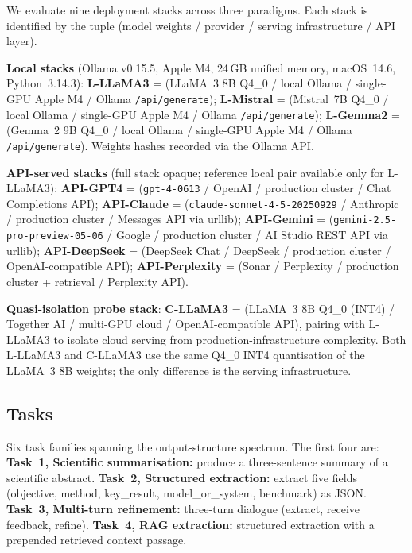 \documentclass[sn-nature]{sn-jnl}
\begin{document}
We evaluate nine deployment stacks across three paradigms.
Each stack is identified by the tuple (model weights / provider / serving infrastructure / API layer).

\textbf{Local stacks} (Ollama v0.15.5, Apple M4, 24\,GB unified memory, macOS~14.6, Python~3.14.3):
\textbf{L-LLaMA3} = (LLaMA~3 8B Q4\_0\cite{grattafiori2024llama3} / local Ollama / single-GPU Apple M4 / Ollama \texttt{/api/generate});
\textbf{L-Mistral} = (Mistral~7B Q4\_0\cite{jiang2023mistral} / local Ollama / single-GPU Apple M4 / Ollama \texttt{/api/generate});
\textbf{L-Gemma2} = (Gemma~2 9B Q4\_0\cite{team2024gemma} / local Ollama / single-GPU Apple M4 / Ollama \texttt{/api/generate}).
Weights hashes recorded via the Ollama API.

\textbf{API-served stacks} (full stack opaque; reference local pair available only for L-LLaMA3):
\textbf{API-GPT4} = (\texttt{gpt-4-0613}\cite{achiam2023gpt4} / OpenAI / production cluster / Chat Completions API);
\textbf{API-Claude} = (\texttt{claude-sonnet-4-5-20250929}\cite{anthropic2024claude} / Anthropic / production cluster / Messages API via urllib);
\textbf{API-Gemini} = (\texttt{gemini-2.5-pro-preview-05-06}\cite{reid2024gemini15} / Google / production cluster / AI Studio REST API via urllib);
\textbf{API-DeepSeek} = (DeepSeek Chat / DeepSeek / production cluster / OpenAI-compatible API);
\textbf{API-Perplexity} = (Sonar / Perplexity / production cluster + retrieval / Perplexity API).

\textbf{Quasi-isolation probe stack}:
\textbf{C-LLaMA3} = (LLaMA~3 8B Q4\_0 (INT4)\cite{grattafiori2024llama3} / Together AI / multi-GPU cloud / OpenAI-compatible API), pairing with L-LLaMA3 to isolate cloud serving from production-infrastructure complexity. Both L-LLaMA3 and C-LLaMA3 use the same Q4\_0 INT4 quantisation of the LLaMA~3 8B weights; the only difference is the serving infrastructure.


\subsection{Tasks}\label{subsec:tasks}

Six task families spanning the output-structure spectrum.
The first four are:
\textbf{Task~1, Scientific summarisation:} produce a three-sentence summary of a scientific abstract.
\textbf{Task~2, Structured extraction:} extract five fields (objective, method, key\_result, model\_or\_system, benchmark) as JSON.
\textbf{Task~3, Multi-turn refinement:} three-turn dialogue (extract, receive feedback, refine).
\textbf{Task~4, RAG extraction:} structured extraction with a prepended retrieved context passage.
\end{document}
